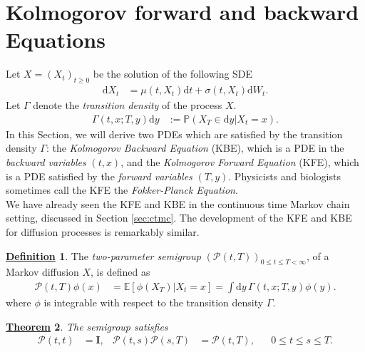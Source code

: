 \documentclass[12pt]{book}
\let\varphi\phi
\numberwithin{equation}{chapter}
\theoremstyle{plain}
\newtheorem{theorem}{\underline{Theorem}}
\numberwithin{theorem}{section}
\theoremstyle{definition}
\newtheorem{definition}[theorem]{\underline{Definition}}
\numberwithin{exercise}{chapter}
\newcommand{\<}{\langle}
\renewcommand{\>}{\rangle}
\renewcommand{\(}{\left(}
\renewcommand{\)}{\right)}
\renewcommand{\[}{\left[}
\renewcommand{\]}{\right]}
\newcommand\Eb{\mathds{E}}
\newcommand\Pb{\mathds{P}}
\newcommand\Pc{\mathscr{P}}
\newcommand\sig{\sigma}
\newcommand\Gam{\Gamma}
\newcommand\Iv{\pmb{I}}
\newcommand\dd{\mathrm{d}}
\begin{document}

\section{Kolmogorov forward and backward Equations}
\label{eq:kbe.kfe}
Let $X = (X_t)_{t \geq 0}$ be the solution of the following SDE
\begin{align}
\dd X_t
	&=	\mu(t,X_t) \dd t + \sig(t,X_t) \dd W_t .
\end{align}
Let $\Gam$ denote the \emph{transition density} of the process $X$.
\begin{align}
\Gam(t,x;T,y) \dd y
	&:= \Pb( X_T \in \dd y | X_t = x ) .
\end{align}
In this Section, we will derive two PDEs which are satisfied by the transition density $\Gam$: the \emph{Kolmogorov Backward Equation} (KBE), which is a PDE in the \emph{backward variables} $(t,x)$, and the \emph{Kolmogorov Forward Equation} (KFE), which is a PDE satisfied by the \emph{forward variables} $(T,y)$.  Physicists and biologists sometimes call the KFE the \emph{Fokker-Planck Equation}.
\\[0.5em]
We have already seen the KFE and KBE in the continuous time Markov chain setting, discussed in Section \ref{sec:ctmc}.  The development of the KFE and KBE for diffusion processes is remarkably similar.  

\begin{definition}
The \emph{two-parameter semigroup} $(\Pc(t,T))_{0 \leq t \leq T < \infty}$, of a Markov diffusion $X$, is defined as
\begin{align}
\Pc(t,T) \varphi(x)
	&=	\Eb[  \varphi(X_T) | X_t = x ]
	=		\int \dd y \, \Gam(t,x;T,y) \varphi(y) .
\end{align}
where $\varphi$ is integrable with respect to the transition density $\Gam$.
\end{definition}

\begin{theorem}
The semigroup satisfies
\begin{align}
\Pc(t,t) 
	&= \Iv , &
\Pc(t,s) \Pc(s,T)
	&=	\Pc(t,T) , &
	&0 \leq t \leq s \leq T .
\end{align}
\end{theorem}
\end{document}

